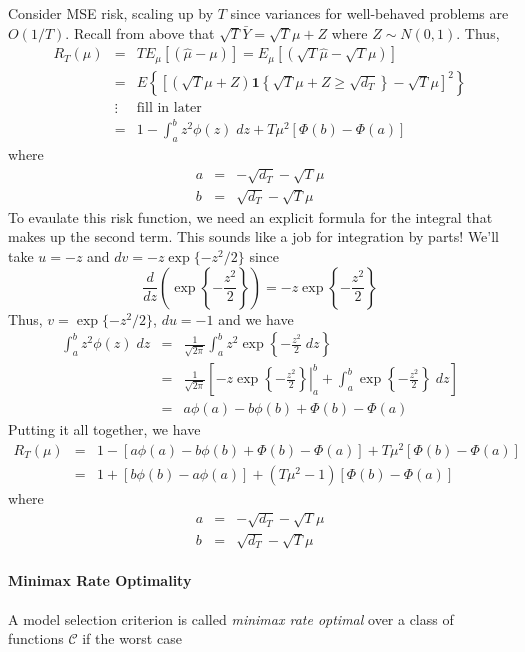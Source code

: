 \documentclass[12pt]{article}
\theoremstyle{definition}
\begin{document}
Consider MSE risk, scaling up by $T$ since variances for well-behaved problems are $O(1/T)$. Recall from above that $\sqrt{T} \bar{Y} = \sqrt{T}\mu +Z$ where $Z\sim N(0,1)$. Thus,
\begin{eqnarray*}
	R_T(\mu) &=& T E_\mu\left[\left( \widehat{\mu} - \mu\right)\right] = E_\mu\left[\left(\sqrt{T} \widehat{\mu} - \sqrt{T} \mu\right)\right]\\
		&=& E\left\{\left[ \left(\sqrt{T}\mu + Z \right)\mathbf{1}\left\{\sqrt{T}\mu + Z \geq \sqrt{d_T}\right\}- \sqrt{T}\mu \right]^2 \right\}\\
		&\vdots& \boxed{\mbox{fill in later}}\\
		&=& 1 - \int_{a}^{b} z^2 \phi(z)\; dz + T\mu^2 \left[\Phi(b) - \Phi(a) \right]
\end{eqnarray*}
where
	\begin{eqnarray*}
		a &=& -\sqrt{d_T} - \sqrt{T}\mu\\
		b &=& \sqrt{d_T} - \sqrt{T}\mu
	\end{eqnarray*}
To evaulate this risk function, we need an explicit formula for the integral that makes up the second term. This sounds like a job for integration by parts! We'll take $u = -z$ and $dv = -z \exp\{-z^2/2\}$ since
	$$\frac{d}{dz} \left(\exp\left\{-\frac{z^2}{2}\right\}\right) = -z\exp\left\{-\frac{z^2}{2}\right\}$$
Thus, $v = \exp\{-z^2/2\}$, $du = -1$ and we have
\begin{eqnarray*}
	\int_a^b z^2 \phi(z) \; dz &=&\frac{1}{\sqrt{2\pi}} \int_a^b z^2 \exp\left\{-\frac{z^2}{2} \; dz\right\} \\
		&=& \frac{1}{\sqrt{2\pi}}\left[-z \exp\left\{ \left.-\frac{z^2}{2}\right\}\right|_a^b+ \int_a^b \exp\left\{-\frac{z^2}{2}\right\}  \; dz \right]\\
		&=& a\phi(a) - b\phi(b) + \Phi(b) - \Phi(a)
\end{eqnarray*}
Putting it all together, we have
	\begin{eqnarray*}
		R_T(\mu) &=& 1 - \left[a\phi(a) - b\phi(b) + \Phi(b) - \Phi(a) \right] + T\mu^2 \left[\Phi(b) - \Phi(a) \right]\\
		&=&1 + \left[b\phi(b) - a\phi(a)\right]  + (T\mu^2 - 1) \left[\Phi(b) - \Phi(a) \right] 
	\end{eqnarray*}
where
	\begin{eqnarray*}
		a &=& -\sqrt{d_T} - \sqrt{T}\mu\\
		b &=& \sqrt{d_T} - \sqrt{T}\mu
	\end{eqnarray*}



\paragraph{Minimax Rate Optimality} A model selection criterion is called \emph{minimax rate optimal} over a class of functions $\mathcal{C}$ if the worst case 
\end{document}
